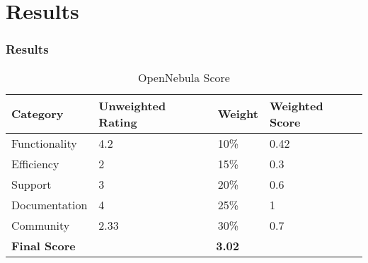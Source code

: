 \section{Results}

\begin{frame}[allowframebreaks]
\frametitle{Results}

\begin{table}[H]
  \begin{center}
    \begin{tabular}{ | p{3cm} | p{2.5cm} | p{1.5cm} | p{2cm} | }
    \toprule
    \textbf{Category} & \textbf{Unweighted Rating} & \textbf{Weight} & \textbf{Weighted Score}\\
    \hline
    Functionality & 4.2 & 10\% & 0.42\\
    \hline
    Efficiency & 2 & 15\% & 0.3\\
    \hline
    Support & 3 & 20\% & 0.6\\
    \hline
    Documentation & 4 & 25\% & 1\\
    \hline
    Community & 2.33 & 30\% & 0.7\\
    \midrule
    \textbf{Final Score} & \multicolumn {3}{c|}{\textbf{3.02}}\\
    \bottomrule
    \end{tabular}
    \caption{OpenNebula Score}
    \label{tab:final_score}
  \end{center}
\end{table}

\end{frame}
